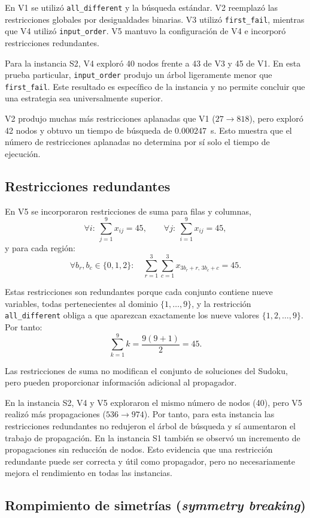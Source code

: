 \documentclass[12pt]{article}
\begin{document}
En V1 se utilizó \texttt{all\_different} y la búsqueda estándar. V2 reemplazó las restricciones globales por desigualdades binarias. V3 utilizó \texttt{first\_fail}, mientras que V4 utilizó \texttt{input\_order}. V5 mantuvo la configuración de V4 e incorporó restricciones redundantes.

Para la instancia S2, V4 exploró 40 nodos frente a 43 de V3 y 45 de V1. En esta prueba particular, \texttt{input\_order} produjo un árbol ligeramente menor que \texttt{first\_fail}. Este resultado es específico de la instancia y no permite concluir que una estrategia sea universalmente superior.

V2 produjo muchas más restricciones aplanadas que V1 ($27 \rightarrow 818$), pero exploró 42 nodos y obtuvo un tiempo de búsqueda de $0.000247$~s. Esto muestra que el número de restricciones aplanadas no determina por sí solo el tiempo de ejecución.

\subsection{Restricciones redundantes}

En V5 se incorporaron restricciones de suma para filas y columnas,
\[
\forall i:\ \sum_{j=1}^{9}x_{ij}=45,
\qquad
\forall j:\ \sum_{i=1}^{9}x_{ij}=45,
\]
y para cada región:
\[
\forall b_r,b_c\in\{0,1,2\}:\quad
\sum_{r=1}^{3}\sum_{c=1}^{3} x_{3b_r+r,\,3b_c+c}=45.
\]

Estas restricciones son redundantes porque cada conjunto contiene nueve variables, todas pertenecientes al dominio $\{1,\ldots,9\}$, y la restricción \texttt{all\_different} obliga a que aparezcan exactamente los nueve valores $\{1,2,\ldots,9\}$. Por tanto:
\[
\sum_{k=1}^{9}k=\frac{9(9+1)}{2}=45.
\]

Las restricciones de suma no modifican el conjunto de soluciones del Sudoku, pero pueden proporcionar información adicional al propagador.

En la instancia S2, V4 y V5 exploraron el mismo número de nodos (40), pero V5 realizó más propagaciones ($536\rightarrow 974$). Por tanto, para esta instancia las restricciones redundantes no redujeron el árbol de búsqueda y sí aumentaron el trabajo de propagación. En la instancia S1 también se observó un incremento de propagaciones sin reducción de nodos. Esto evidencia que una restricción redundante puede ser correcta y útil como propagador, pero no necesariamente mejora el rendimiento en todas las instancias.

\subsection{Rompimiento de simetrías (\emph{symmetry breaking})}
\end{document}
